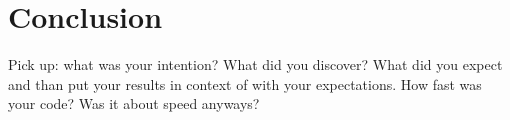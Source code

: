\chapter{Conclusion}
Pick up: what was your intention? What did you discover? What did you expect and than put your results in context of with your expectations.
How fast was your code? Was it about speed anyways? 
